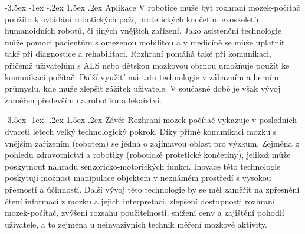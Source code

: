 \documentclass[a4paper,10pt]{article}
\makeatletter
\theoremstyle{definition}
\renewcommand\section{\@startsection {section}{1}{\z@}%
                                   {-3.5ex \@plus -1ex \@minus -.2ex}%
                                   {1.5ex \@plus.2ex}%
                                   {\large\bfseries}}
\makeatother
\begin{document}
\section{Aplikace}
\label{sec:5}
V robotice může být rozhraní mozek-počítač použito k ovládání robotických paží, protetických končetin, exoskeletů, humanoidních robotů, či jiných vnějších zařízení. Jako asistenční technologie může pomoci pacientům s omezenou mobilitou a v medicíně se může uplatnit také při diagnostice a rehabilitaci. Rozhraní pomáhá také při komunikaci, přičemž uživatelům s ALS nebo dětskou mozkovou obrnou umožňuje použít ke komunikaci počítač. Další využití má tato technologie v zábavním a herním průmyslu, kde může zlepšit zážitek uživatele. V současné době je však vývoj zaměřen především na robotiku a lékařství.\cite{AI2023obrazovky, article, athanasiou2017rehabilitation, handshake, article3, inbook2, s23136001obrazekmozkusesenzory, s22135000, article4, article2, inbook, zhou2023shared}


\section{Závěr}
\label{sec:6}
Rozhraní mozek-počítač vykazuje v posledních dvaceti letech velký technologický pokrok. Díky přímé komunikaci mozku s vnějším zařízením (robotem) se jedná o zajímavou oblast pro výzkum. Zejména z pohledu zdravotnictví a robotiky (robotické protetické končetiny), jelikož může poskytnout náhradu senzoricko-motorických funkcí. Inovace této technologie poskytují možnost manipulace objektem v neznámém prostředí s vysokou přesností a účinností. Další vývoj této technologie by se měl zaměřit na zpřesnění čtení informací z mozku a jejich interpretaci, zlepšení dostupnosti rozhraní mozek-počítač, zvýšení rozsahu použitelnosti, snížení ceny a zajištění pohodlí uživatele, a to zejména u neinvazivních technik měření mozkové aktivity.

\bigskip
%
\begingroup
\makeatletter
\renewcommand\section{\@startsection {section}{1}{\z@}%
                                   {-3.5ex \@plus -1ex \@minus -.2ex}%
                                   {4.5ex \@plus.2ex}%
                                   {\large\bfseries}}
\makeatother

\nocite{*}
{}

\endgroup
\end{document}

